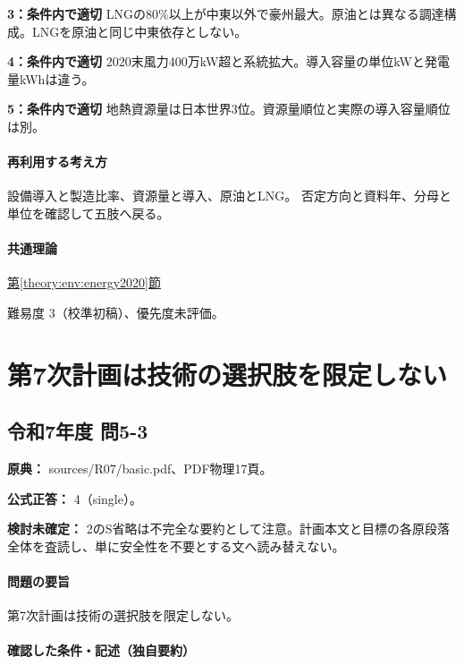 \noindent\textbf{3：条件内で適切} LNGの80\%以上が中東以外で豪州最大。原油とは異なる調達構成。LNGを原油と同じ中東依存としない。\par

\noindent\textbf{4：条件内で適切} 2020末風力400万kW超と系統拡大。導入容量の単位kWと発電量kWhは違う。\par

\noindent\textbf{5：条件内で適切} 地熱資源量は日本世界3位。資源量順位と実際の導入容量順位は別。\par

\paragraph{再利用する考え方} 設備導入と製造比率、資源量と導入、原油とLNG。 否定方向と資料年、分母と単位を確認して五肢へ戻る。

\paragraph{共通理論} \hyperref[theory:env:energy2020]{第\ref*{theory:env:energy2020}節}

\par 難易度 3（校準初稿）、優先度未評価。

\section{第7次計画は技術の選択肢を限定しない}

\subsection{令和7年度 問5-3}
\label{q:r07-reg-basic-5-3}

\noindent\textbf{原典：} sources/R07/basic.pdf、PDF物理17頁。

\textbf{公式正答：} 4（single）。

\par\textbf{検討未確定：} 2のS省略は不完全な要約として注意。計画本文と目標の各原段落全体を査読し、単に安全性を不要とする文へ読み替えない。

\paragraph{問題の要旨} 第7次計画は技術の選択肢を限定しない。

\paragraph{確認した条件・記述（独自要約）}\mbox{}\par

